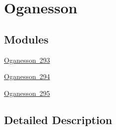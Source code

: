 \hypertarget{group___isotope_const-_oganesson}{}\section{Oganesson}
\label{group___isotope_const-_oganesson}
\subsection*{Modules}
\begin{DoxyCompactItemize}
\item 
\mbox{\hyperlink{group___isotope_const-_oganesson-_og293}{Oganesson 293}}
\item 
\mbox{\hyperlink{group___isotope_const-_oganesson-_og294}{Oganesson 294}}
\item 
\mbox{\hyperlink{group___isotope_const-_oganesson-_og295}{Oganesson 295}}
\end{DoxyCompactItemize}


\subsection{Detailed Description}
